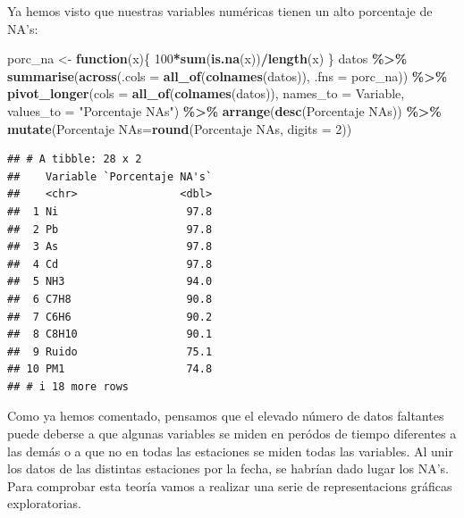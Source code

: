 \documentclass[notspecified,article,submit,moreauthors,pdftex]{Definitions/mdpi}
\newenvironment{Shaded}{\begin{snugshade}}{\end{snugshade}}
\newcommand{\AttributeTok}[1]{\textcolor[rgb]{0.13,0.29,0.53}{#1}}
\newcommand{\ControlFlowTok}[1]{\textcolor[rgb]{0.13,0.29,0.53}{\textbf{#1}}}
\newcommand{\DecValTok}[1]{\textcolor[rgb]{0.00,0.00,0.81}{#1}}
\newcommand{\FunctionTok}[1]{\textcolor[rgb]{0.13,0.29,0.53}{\textbf{#1}}}
\newcommand{\NormalTok}[1]{#1}
\newcommand{\OtherTok}[1]{\textcolor[rgb]{0.56,0.35,0.01}{#1}}
\newcommand{\SpecialCharTok}[1]{\textcolor[rgb]{0.81,0.36,0.00}{\textbf{#1}}}
\newcommand{\StringTok}[1]{\textcolor[rgb]{0.31,0.60,0.02}{#1}}
\begin{document}
Ya hemos visto que nuestras variables numéricas tienen un alto
porcentaje de NA's:

\begin{Shaded}
\begin{Highlighting}[]
\NormalTok{porc\_na }\OtherTok{\textless{}{-}} \ControlFlowTok{function}\NormalTok{(x)\{}
  \DecValTok{100}\SpecialCharTok{*}\FunctionTok{sum}\NormalTok{(}\FunctionTok{is.na}\NormalTok{(x))}\SpecialCharTok{/}\FunctionTok{length}\NormalTok{(x)}
\NormalTok{\}}
\NormalTok{datos }\SpecialCharTok{\%\textgreater{}\%} 
  \FunctionTok{summarise}\NormalTok{(}\FunctionTok{across}\NormalTok{(}\AttributeTok{.cols =} \FunctionTok{all\_of}\NormalTok{(}\FunctionTok{colnames}\NormalTok{(datos)), }\AttributeTok{.fns =}\NormalTok{ porc\_na)) }\SpecialCharTok{\%\textgreater{}\%} 
  \FunctionTok{pivot\_longer}\NormalTok{(}\AttributeTok{cols =} \FunctionTok{all\_of}\NormalTok{(}\FunctionTok{colnames}\NormalTok{(datos)), }\AttributeTok{names\_to =} \StringTok{\textquotesingle{}Variable\textquotesingle{}}\NormalTok{, }\AttributeTok{values\_to =} \StringTok{"Porcentaje NA\textquotesingle{}s"}\NormalTok{) }\SpecialCharTok{\%\textgreater{}\%}
  \FunctionTok{arrange}\NormalTok{(}\FunctionTok{desc}\NormalTok{(}\StringTok{\textasciigrave{}}\AttributeTok{Porcentaje NA\textquotesingle{}s}\StringTok{\textasciigrave{}}\NormalTok{)) }\SpecialCharTok{\%\textgreater{}\%} 
  \FunctionTok{mutate}\NormalTok{(}\StringTok{\textasciigrave{}}\AttributeTok{Porcentaje NA\textquotesingle{}s}\StringTok{\textasciigrave{}}\OtherTok{=}\FunctionTok{round}\NormalTok{(}\StringTok{\textasciigrave{}}\AttributeTok{Porcentaje NA\textquotesingle{}s}\StringTok{\textasciigrave{}}\NormalTok{, }\AttributeTok{digits =} \DecValTok{2}\NormalTok{))}
\end{Highlighting}
\end{Shaded}

\begin{verbatim}
## # A tibble: 28 x 2
##    Variable `Porcentaje NA's`
##    <chr>                <dbl>
##  1 Ni                    97.8
##  2 Pb                    97.8
##  3 As                    97.8
##  4 Cd                    97.8
##  5 NH3                   94.0
##  6 C7H8                  90.8
##  7 C6H6                  90.2
##  8 C8H10                 90.1
##  9 Ruido                 75.1
## 10 PM1                   74.8
## # i 18 more rows
\end{verbatim}

Como ya hemos comentado, pensamos que el elevado número de datos
faltantes puede deberse a que algunas variables se miden en peródos de
tiempo diferentes a las demás o a que no en todas las estaciones se
miden todas las variables. Al unir los datos de las distintas estaciones
por la fecha, se habrían dado lugar los NA's. Para comprobar esta teoría
vamos a realizar una serie de representacions gráficas exploratorias.
\end{document}
